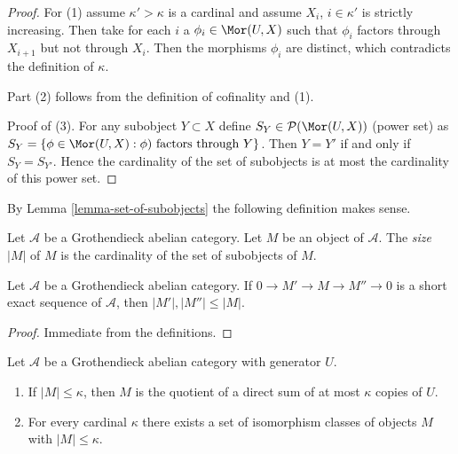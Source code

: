 \begin{proof}
For (1) assume $\kappa' > \kappa$ is a cardinal and assume
$X_i$, $i \in \kappa'$ is strictly increasing. Then take for
each $i$ a $\phi_i \in \Mor(U, X)$ such that $\phi_i$ factors through
$X_{i + 1}$ but not through $X_i$. Then the morphisms $\phi_i$
are distinct, which contradicts the definition of $\kappa$.

\medskip\noindent
Part (2) follows from the definition of cofinality and (1).

\medskip\noindent
Proof of (3). For any subobject $Y \subset X$
define $S_Y \in \mathcal{P}(\Mor(U, X))$ (power set) as
$S_Y = \{\phi \in \Mor(U,X) : \phi)\text{ factors through }Y\}$.
Then $Y = Y'$ if and only if $S_Y = S_{Y'}$. Hence the cardinality
of the set of subobjects is at most the cardinality of this power set.
\end{proof}

\noindent
By Lemma \ref{lemma-set-of-subobjects} the following definition makes sense.

\begin{definition}
\label{definition-size}
Let $\mathcal{A}$ be a Grothendieck abelian category.
Let $M$ be an object of $\mathcal{A}$.
The {\it size} $|M|$ of $M$ is the cardinality of the set of subobjects
of $M$.
\end{definition}

\begin{lemma}
\label{lemma-size-goes-down}
Let $\mathcal{A}$ be a Grothendieck abelian category.
If $0 \to M' \to M \to M'' \to 0$ is a short exact sequence of
$\mathcal{A}$, then $|M'|, |M''| \leq |M|$.
\end{lemma}

\begin{proof}
Immediate from the definitions.
\end{proof}

\begin{lemma}
\label{lemma-set-iso-classes-bounded-size}
Let $\mathcal{A}$ be a Grothendieck abelian category with generator $U$.
\begin{enumerate}
\item If $|M| \leq \kappa$, then $M$ is the quotient of a direct
sum of at most $\kappa$ copies of $U$.
\item For every cardinal $\kappa$ there exists a set of isomorphism classes
of objects $M$ with $|M| \leq \kappa$.
\end{enumerate}
\end{lemma}

